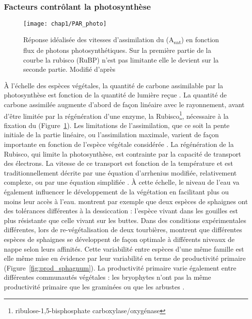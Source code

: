 \subsubsection{Facteurs contrôlant la photosynthèse}

\begin{figure}
\centering
\texttt{[image: chap1/PAR\_photo]}
\caption{Réponse idéalisée des vitesses d'assimilation du \coo (A\textsubscript{sat}) en fonction flux de photons photosynthétiques. Sur la première partie de la courbe la rubisco (RuBP) n'est pas limitante elle le devient sur la seconde partie. Modifié d'après \citet{long1993}}
\label{fig:PAR_photo}
\end{figure}

À l'échelle des espèces végétales, la quantité de carbone assimilable par la photosynthèse est fonction de la quantité de lumière reçue \citep{long1993}.
La quantité de carbone assimilée augmente d'abord de façon linéaire avec le rayonnement, avant d'être limitée par la régénération d'une enzyme, la Rubisco\footnote{ribulose-1,5-bisphosphate carboxylase/oxygénase}, nécessaire à la fixation du \coo (Figure~\ref{fig:PAR_photo}).
Les limitations de l'assimilation, que ce soit la pente initiale de la partie linéaire, ou l'assimilation maximale, varient de façon importante en fonction de l'espèce végétale considérée \citep{wullschleger1993}.
La régénération de la Rubisco, qui limite la photosynthèse, est contrainte par la capacité de transport des électrons.
La vitesse de ce transport est fonction de la température et est traditionnellement décrite par une équation d'arrhenius modifiée, relativement complexe, ou par une équation simplifiée \citep{farquhar1980,june2004}.
À cette échelle, le niveau de l'eau va également influencer le développement de la végétation en facilitant plus ou moins leur accès à l'eau.
\citet{wagner1984} montrent par exemple que deux espèces de sphaignes ont des tolérances différentes à la dessiccation : l'espèce vivant dans les gouilles est plus résistante que celle vivant sur les buttes.
Dans des conditions expérimentales différentes, lors de re-végétalisation de deux tourbières, \cite{robroek2009} montrent que différentes espèces de sphaignes se développent de façon optimale à différents niveaux de nappe selon leurs affinités.
Cette variabilité entre espèces d'une même famille est elle même mise en évidence par leur variabilité en terme de productivité primaire (Figure~\ref{fig:prod_sphagnum}).
La productivité primaire varie également entre différentes communautés végétales : les bryophytes n'ont pas la même productivité primaire que les graminées ou que les arbustes \citetext{\citealp{moore2002} dans \citealp{rydin2013b}}.
